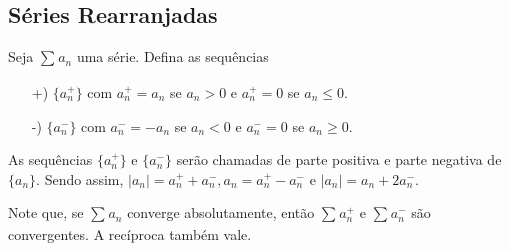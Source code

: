 \documentclass{article}
\begin{document}
\subsection{S\'eries Rearranjadas}
  Seja $\sum\limits_{}^{}a_{n}$ uma s\'erie. Defina as sequ\^encias 
 \begin{itemize}
   \item[+)] $\{a_{n}^{+}\}$ com $a_{n}^{+} = a_{n}$ se $a_{n} > 0$ e $a_{n}^{+}=0$ se $a_{n}\leq{0}.$
   \item[-)] $\{a_{n}^{-}\}$ com $a_{n}^{-} = -a_{n}$ se $a_{n} < 0$ e $a_{n}^{-}=0$ se $a_{n}\geq{0}.$
 \end{itemize}
 As sequ\^encias $\{a_{n}^{+}\}$ e $\{a_{n}^{-}\}$ ser\~ao chamadas de parte positiva e parte negativa de $\{a_{n}\}$. Sendo assim,
 $|a_{n}|=a_{n}^{+}+a_{n}^{-}, a_{n} = a_{n}^{+}-a_{n}^{-}$ e $|a_{n}| = a_{n} + 2a_{n}^{-}.$

 Note que, se $\sum\limits_{}^{}a_{n}$ converge absolutamente, ent\~ao $\sum\limits_{}^{}a_{n}^{+}$ e $\sum\limits_{}^{}a_{n}^{-}$
 s\~ao convergentes. A rec\'iproca tamb\'em vale.
\end{document}
